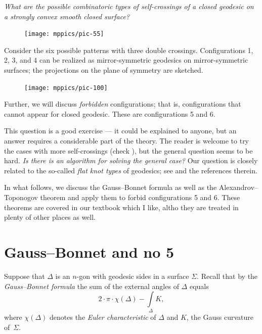 \documentclass[oneside,a4paper]{amsart}
\begin{document}
\medskip

\emph{What are the possible combinatoric types of self-crossings of a closed geodesic on a strongly convex smooth closed surface?}

\begin{figure}[ht!]
\begin{center}
\texttt{[image: mppics/pic-55]}
\end{center}
\end{figure}

Consider the six possible patterns with three double crossings.
Configurations 1, 2, 3, and 4 can be realized as mirror-symmetric geodesics on mirror-symmetric surfaces; the projections on the plane of symmetry are sketched.
\begin{figure}[ht!]
\begin{center}
\texttt{[image: mppics/pic-100]}
\end{center}
\end{figure}

Further, we will discuss \emph{forbidden} configurations;
that is, configurations that cannot appear for closed geodesic.
These are configurations 5 and 6.

This question is a good exercise --- it could be explained to anyone, but an answer requires a considerable part of the theory.
The reader is welcome to try the cases with more self-crossings (check \cite[Figures 15--17]{arnold}), but the general question seems to be hard.
\emph{Is there is an algorithm for solving the general case?} 
Our question is closely related to the so-called \emph{flat knot types} of geodesics;
see \cite{angenent} and the references therein.

In what follows, we discuss the Gauss--Bonnet formula as well as the Alexandrov--Toponogov theorem and apply them to forbid configurations 5 and 6.
These theorems are covered in our textbook \cite{petrunin-zamora} which I like, altho they are treated in plenty of other places as well.


\section*{Gauss--Bonnet and no 5}

Suppose that $\Delta$ is an $n$-gon with geodesic sides in a surface $\Sigma$.
Recall that by the \emph{Gauss--Bonnet formula} the sum of the external angles of $\Delta$ equals
\[2\cdot\pi\cdot\chi(\Delta)-\int\limits_\Delta K,\]
where $\chi(\Delta)$ denotes the \emph{Euler characteristic} of $\Delta$ and $K$, the Gauss curvature of~$\Sigma$.
\end{document}
